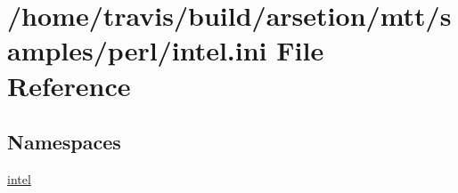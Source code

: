 \hypertarget{intel_8ini}{\section{/home/travis/build/arsetion/mtt/samples/perl/intel.ini File Reference}
\label{intel_8ini}
}
\subsection*{Namespaces}
\begin{DoxyCompactItemize}
\item 
\hyperlink{namespaceintel}{intel}
\end{DoxyCompactItemize}

